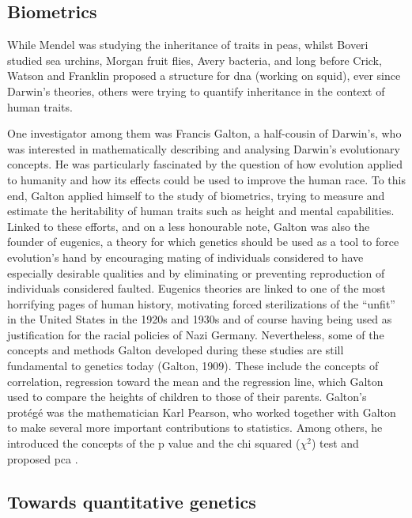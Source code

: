 \subsection{Biometrics} %
While Mendel was studying the inheritance of traits in peas, whilst Boveri studied sea urchins, Morgan fruit flies, Avery bacteria, and long before Crick, Watson and Franklin proposed a structure for \gls{dna} (working on squid), ever since Darwin’s theories, others were trying to quantify inheritance in the context of human traits.

One investigator among them was Francis Galton, a half-cousin of Darwin’s, who was interested in mathematically describing and analysing Darwin’s evolutionary concepts. 
He was particularly fascinated by the question of how evolution applied to humanity and how its effects could be used to improve the human race. 
To this end, Galton applied himself to the study of biometrics, trying to measure and estimate the heritability of human traits such as height and mental capabilities. 
Linked to these efforts, and on a less honourable note, Galton was also the founder of eugenics, a theory for which genetics should be used as a tool to force evolution’s hand by encouraging mating of individuals considered to have especially desirable qualities and by eliminating or preventing reproduction of individuals considered faulted. Eugenics theories are linked to one of the most horrifying pages of human history, motivating forced sterilizations of the “unfit” in the United States in the 1920s and 1930s and of course having being used as justification for the racial policies of Nazi Germany.
Nevertheless, some of the concepts and methods Galton developed during these studies are still fundamental to genetics today (Galton, 1909). 
These include the concepts of correlation, regression toward the mean and the regression line, which Galton used to compare the heights of children to those of their parents. Galton’s protégé was the mathematician Karl Pearson, who worked together with Galton to make several more important contributions to statistics. Among others, he introduced the concepts of the p value and the chi squared ($\chi^2$) test \cite{pearson1900x} and proposed \gls{pca} \cite{pearson1901liii}.

\subsection{Towards quantitative genetics} %

